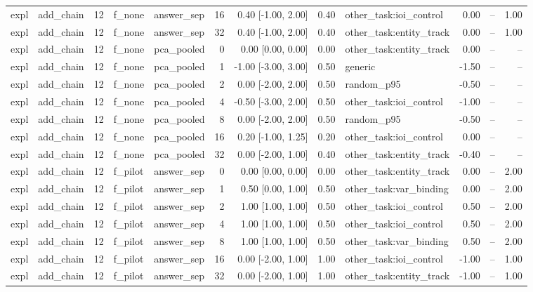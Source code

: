 \begin{tabular}{llrllrrrlrrr}
expl & add\_chain & 12 & f\_none & answer\_sep & 16 & 0.40 [-1.00, 2.00] & 0.40 & other\_task:ioi\_control & 0.00 & -- & 1.00 \\
expl & add\_chain & 12 & f\_none & answer\_sep & 32 & 0.40 [-1.00, 2.00] & 0.40 & other\_task:entity\_track & 0.00 & -- & 1.00 \\
expl & add\_chain & 12 & f\_none & pca\_pooled & 0 & 0.00 [0.00, 0.00] & 0.00 & other\_task:entity\_track & 0.00 & -- & -- \\
expl & add\_chain & 12 & f\_none & pca\_pooled & 1 & -1.00 [-3.00, 3.00] & 0.50 & generic & -1.50 & -- & -- \\
expl & add\_chain & 12 & f\_none & pca\_pooled & 2 & 0.00 [-2.00, 2.00] & 0.50 & random\_p95 & -0.50 & -- & -- \\
expl & add\_chain & 12 & f\_none & pca\_pooled & 4 & -0.50 [-3.00, 2.00] & 0.50 & other\_task:ioi\_control & -1.00 & -- & -- \\
expl & add\_chain & 12 & f\_none & pca\_pooled & 8 & 0.00 [-2.00, 2.00] & 0.50 & random\_p95 & -0.50 & -- & -- \\
expl & add\_chain & 12 & f\_none & pca\_pooled & 16 & 0.20 [-1.00, 1.25] & 0.20 & other\_task:ioi\_control & 0.00 & -- & -- \\
expl & add\_chain & 12 & f\_none & pca\_pooled & 32 & 0.00 [-2.00, 1.00] & 0.40 & other\_task:entity\_track & -0.40 & -- & -- \\
expl & add\_chain & 12 & f\_pilot & answer\_sep & 0 & 0.00 [0.00, 0.00] & 0.00 & other\_task:entity\_track & 0.00 & -- & 2.00 \\
expl & add\_chain & 12 & f\_pilot & answer\_sep & 1 & 0.50 [0.00, 1.00] & 0.50 & other\_task:var\_binding & 0.00 & -- & 2.00 \\
expl & add\_chain & 12 & f\_pilot & answer\_sep & 2 & 1.00 [1.00, 1.00] & 0.50 & other\_task:ioi\_control & 0.50 & -- & 2.00 \\
expl & add\_chain & 12 & f\_pilot & answer\_sep & 4 & 1.00 [1.00, 1.00] & 0.50 & other\_task:ioi\_control & 0.50 & -- & 2.00 \\
expl & add\_chain & 12 & f\_pilot & answer\_sep & 8 & 1.00 [1.00, 1.00] & 0.50 & other\_task:var\_binding & 0.50 & -- & 2.00 \\
expl & add\_chain & 12 & f\_pilot & answer\_sep & 16 & 0.00 [-2.00, 1.00] & 1.00 & other\_task:ioi\_control & -1.00 & -- & 1.00 \\
expl & add\_chain & 12 & f\_pilot & answer\_sep & 32 & 0.00 [-2.00, 1.00] & 1.00 & other\_task:entity\_track & -1.00 & -- & 1.00 \\

\end{tabular}

